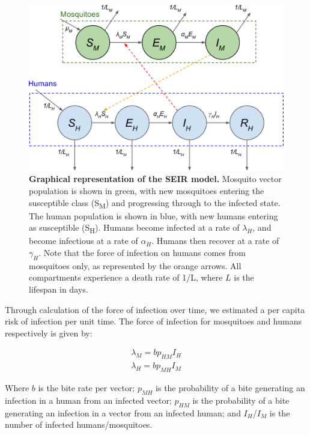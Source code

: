 \documentclass[10pt,letterpaper]{article}
\begin{document}
\begin{figure}[htbp]
\centering
\includegraphics[width=5.20833in]{figures/Fig1.png}
\caption{\textbf{Graphical representation of the SEIR model.} Mosquito
vector population is shown in green, with new mosquitoes entering the
susceptible class (S\textsubscript{M}) and progressing through to the
infected state. The human population is shown in blue, with new humans
entering as susceptible (S\textsubscript{H}). Humans become infected at
a rate of \(\lambda_H\), and become infectious at a rate of
\(\alpha_H\). Humans then recover at a rate of \(\gamma_H\). Note that
the force of infection on humans comes from mosquitoes only, as
represented by the orange arrows. All compartments experience a death
rate of 1/L, where \(L\) is the lifespan in days.}
\end{figure}

Through calculation of the force of infection over time, we estimated a
per capita risk of infection per unit time. The force of infection for
mosquitoes and humans respectively is given by:

\begin{equation}
\begin{array}{lr}
\lambda_M = bp_{HM}I_H \\
\lambda_H = bp_{MH}I_M
\end{array}
\end{equation}

Where \(b\) is the bite rate per vector; \(p_{MH}\) is the probability
of a bite generating an infection in a human from an infected vector;
\(p_{HM}\) is the probability of a bite generating an infection in a
vector from an infected human; and \(I_H\)/\(I_M\) is the number of
infected humans/mosquitoes.
\end{document}
